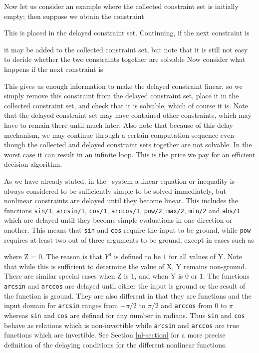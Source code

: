 Now let us consider an example where the collected constraint set is 
initially empty; then suppose we obtain the constraint


\noindent
This is placed in the delayed constraint set. Continuing, if the
next constraint is


\noindent
it may be added to the collected constraint set, but note that it is still
not easy to decide whether the two constraints together are solvable
Now consider what happens if the next constraint is


\noindent
This gives us enough information to make the delayed constraint linear, so
we simply remove this constraint from the delayed constraint set, 
place it in the collected constraint set,
and check that it is solvable, which of course it is. Note that the delayed
constraint set may have contained other constraints, which may have to
remain there until much later. Also note that because of this delay
mechanism, we may continue through a certain computation sequence even
though the collected and delayed constraint sets together are not solvable.
In the worst case it can result in an infinite loop.
This is the price we pay for an efficient decision algorithm.

As we have already stated, in the \CLPR\ system
a linear equation or inequality is always considered to be 
sufficiently simple to be solved immediately, but nonlinear
constraints are delayed until they become linear.
\chgbarbegin
This includes the functions {\tt sin/1}, {\tt arcsin/1}, {\tt cos/1}, 
{\tt arccos/1}, {\tt pow/2},
{\tt max/2}, {\tt min/2} and {\tt abs/1} 
which are delayed until they become 
simple evaluations in one direction or another. 
\chgbarend
This means that {\tt sin} and  
{\tt cos} require the input to be ground, 
while {\tt pow} requires at least two
out of three arguments to be ground, except in cases such as 


\noindent
where Z = 0.
The reason is that $Y^0$ is defined to be $1$ for all values of Y. 
Note that while this
is sufficient to determine the value of X, Y remains non-ground. There are
similar special cases when Z is $1$, and when Y is $0$ or $1$.
\chgbarbegin
The functions {\tt arcsin} and {\tt arccos} are delayed until either the
input is ground or the result of the function is ground. They are also
different in that they are functions and the input domain for {\tt arcsin}
ranges from $-\pi/2$ to $\pi/2$ and {\tt arccos} from $0$ to $\pi$
whereas {\tt sin} and {\tt cos} are defined for any number in radians.
Thus {\tt sin} and {\tt cos} behave as relations which is non-invertible
while {\tt arcsin} and {\tt arccos} are true functions which are invertible.
See Section \ref{nl-section} for a more precise definition
of the delaying conditions
for the different nonlinear functions.
\chgbarend

